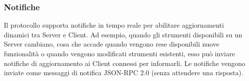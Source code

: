 \subsubsection{Notifiche}
Il protocollo supporta notifiche in tempo reale per abilitare aggiornamenti dinamici tra Server e Client. Ad esempio, quando gli strumenti disponibili su un Server cambiano, cosa che accade quando vengono 
rese disponibili nuove funzionalità o quando vengono modificati strumenti esistenti, esso può inviare notifiche di aggiornamento ai Client connessi per informarli. Le notifiche 
vengono inviate come messaggi di notifica JSON-RPC 2.0 (senza attendere una risposta).
\cite{modelcontextprotocol2024arch}
